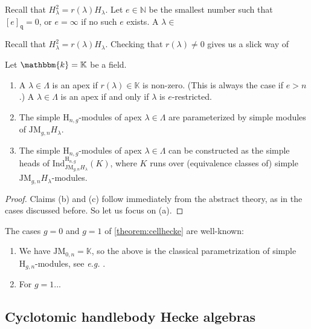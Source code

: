 \documentclass[a4paper,11pt]{amsart}
\newcommand{\eg}{\textsl{e.g.}}
\newcommand{\setstuff}[1]{\mathrm{#1}}
\newcommand{\K}{\mathbb{K}}
\newcommand{\KK}{\mathbbm{k}}
\newcommand{\N}{\mathbb{N}}
\newcommand{\varsym}[1]{\mathtt{#1}}
\newcommand{\qvar}{\varsym{q}}
\numberwithin{equation}{section}
\let\fullref\autoref
\begin{document}
Recall that $H_{\lambda}^{2}=r(\lambda)H_{\lambda}$.
Let $e\in\N$ be the smallest number such that 
$[e]_{\qvar}=0$, or $e=\infty$ if no such 
$e$ exists. A $\lambda\in$

Recall that $H_{\lambda}^{2}=r(\lambda)H_{\lambda}$.
Checking that $r(\lambda)\neq 0$ gives us a slick 
way of 

\begin{theorem}\label{theorem:cellhecke}
Let $\KK=\K$ be a field.
\begin{enumerate}

\item A $\lambda\in\Lambda$ is an apex 
if $r(\lambda)\in\K$ is non-zero. (This is
always the case if $e>n$.) 
A $\lambda\in\Lambda$ is an apex 
if and only if $\lambda$ is $e$-restricted.

\item The simple $\setstuff{H}_{n,g}$-modules of 
apex $\lambda\in\Lambda$ 
are parameterized by simple modules of $\setstuff{JM}_{g,n}H_{\lambda}$.

\item The simple $\setstuff{H}_{n,g}$-modules of 
apex $\lambda\in\Lambda$ can be constructed as 
the simple heads of
$\mathrm{Ind}_{\setstuff{JM}_{g,n}H_{\lambda}}^{\setstuff{H}_{n,g}}(K)$, 
where $K$ runs over (equivalence classes of) 
simple $\setstuff{JM}_{g,n}H_{\lambda}$-modules.

\end{enumerate}
\end{theorem}

\begin{proof}
Claims (b) and (c) follow immediately from the abstract theory, as 
in the cases discussed before. So let us focus on (a).
\end{proof}

\begin{example}
The cases $g=0$ and $g=1$ of \fullref{theorem:cellhecke}
are well-known:
\begin{enumerate}

\item We have $\setstuff{JM}_{0,n}=\K$, so the above 
is the classical parametrization 
of simple $\setstuff{H}_{g,n}$-modules, see {\eg} 
\cite[Section 3.4]{Ma-hecke-schur}.

\item For $g=1$...

\end{enumerate}
\end{example}

\subsection{Cyclotomic handlebody Hecke algebras}\label{subsection:ak-hecke}
\end{document}
